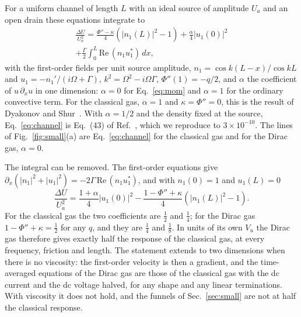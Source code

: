 For a uniform channel of length $L$ with an ideal source of amplitude
$U_{a}$ and an open drain these equations integrate to
\begin{multline}
\frac{\Delta U}{U_{a}^{2}}=\frac{\Phi''-\kappa}{4}\left(|n_{1}(L)|^{2}-1\right)
+\frac{\alpha}{4}|u_{1}(0)|^{2}\\
+\frac{\Gamma}{2}\int_{0}^{L}\mathrm{Re}\,(n_{1}u_{1}^{*})\,dx ,
\label{eq:channel}
\end{multline}
with the first-order fields per unit source amplitude,
$n_{1}=\cos k(L-x)/\cos kL$ and $u_{1}=-n_{1}'/(i\Omega+\Gamma)$,
$k^{2}=\Omega^{2}-i\Omega\Gamma$, $\Phi''(1)=-q/2$, and $\alpha$ the
coefficient of $u\,\partial_{x}u$ in one dimension: $\alpha=0$ for
Eq.~\eqref{eq:mom} and $\alpha=1$ for the ordinary convective term. For
the classical gas, $\alpha=1$ and
$\kappa=\Phi''=0$, this is the result of Dyakonov and
Shur~\cite{dyakonov1996detection}. With $\alpha=1/2$ and the density fixed
at the source, Eq.~\eqref{eq:channel} is Eq.~(43) of
Ref.~\cite{tomadin2013theory}, which we reproduce to $3\times10^{-10}$.
The lines of Fig.~\ref{fig:small}(a) are Eq.~\eqref{eq:channel} for the
classical gas and for the Dirac gas, $\alpha=0$.

The integral can be removed. The first-order equations give
$\partial_{x}(|n_{1}|^{2}+|u_{1}|^{2})=-2\Gamma\,\mathrm{Re}\,(n_{1}u_{1}^{*})$,
and with $n_{1}(0)=1$ and $u_{1}(L)=0$
\begin{equation}
\frac{\Delta U}{U_{a}^{2}}=\frac{1+\alpha}{4}|u_{1}(0)|^{2}
-\frac{1-\Phi''+\kappa}{4}\left(|n_{1}(L)|^{2}-1\right).
\label{eq:half}
\end{equation}
For the classical gas the two coefficients are $\tfrac12$ and $\tfrac14$;
for the Dirac gas $1-\Phi''+\kappa=\tfrac12$ for any $q$, and they are
$\tfrac14$ and $\tfrac18$. In units of its own $V_{u}$ the Dirac gas
therefore gives exactly half the response of the classical gas, at every
frequency, friction and length. The statement extends to two dimensions
when there is no viscosity: the first-order velocity is then a gradient,
and the time-averaged equations of the Dirac gas are those of the
classical gas with the dc current and the dc voltage halved, for any
shape and any linear terminations. With viscosity it does not hold, and
the funnels of Sec.~\ref{sec:small} are not at half the classical
response.

